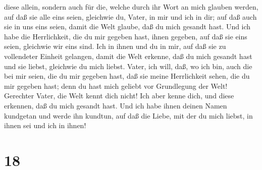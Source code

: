 diese allein, sondern auch für die, welche durch ihr Wort an mich
glauben werden,  auf daß sie alle eins seien, gleichwie
du, Vater, in mir und ich in dir; auf daß auch sie in uns eins seien,
damit die Welt glaube, daß du mich gesandt hast.  Und ich
habe die Herrlichkeit, die du mir gegeben hast, ihnen gegeben, auf daß
sie eins seien, gleichwie wir eins sind.  Ich in ihnen
und du in mir, auf daß sie zu vollendeter Einheit gelangen, damit die
Welt erkenne, daß du mich gesandt hast und sie liebst, gleichwie du mich
liebst.  Vater, ich will, daß, wo ich bin, auch die bei
mir seien, die du mir gegeben hast, daß sie meine Herrlichkeit sehen,
die du mir gegeben hast; denn du hast mich geliebt vor Grundlegung der
Welt!  Gerechter Vater, die Welt kennt dich nicht! Ich
aber kenne dich, und diese erkennen, daß du mich gesandt hast.
 Und ich habe ihnen deinen Namen kundgetan und werde ihn
kundtun, auf daß die Liebe, mit der du mich liebst, in ihnen sei und ich
in ihnen!

\hypertarget{section-17}{%
\section{18}\label{section-17}}

